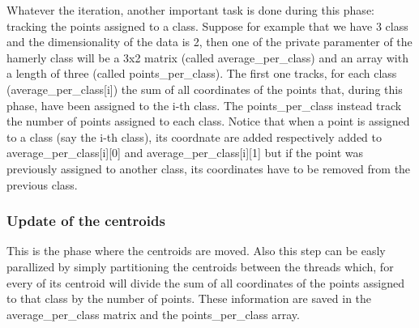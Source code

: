 \documentclass{report}
\begin{document}
\begin{minipage}[b]{0.48\textwidth}
  Whatever the iteration, another important task is done during this phase: tracking the points assigned to a class. Suppose for example that we have 3 class and the dimensionality of the data is 2, then one of the private paramenter of the hamerly class will be a 3x2 matrix (called average\_per\_class) and an array with a length of three (called points\_per\_class). The first one tracks, for each class (average\_per\_class[i]) the sum of all coordinates of the points that, during this phase, have been assigned to the i-th class. The points\_per\_class instead track the number of points assigned to each class. Notice that when a point is assigned to a class (say the i-th class), its coordnate are added respectively added to average\_per\_class[i][0] and average\_per\_class[i][1] but if the point was previously assigned to another class, its coordinates have to be removed from the previous class.

  \subsubsection*{Update of the centroids}
  This is the phase where the centroids are moved. Also this step can be easly parallized by simply partitioning the centroids between the threads which, for every of its centroid will divide the sum of all coordinates of the points assigned to that class by the number of points. These information are saved in the average\_per\_class matrix and the points\_per\_class array.
\end{minipage}
\hspace{0.1in}
\end{document}
